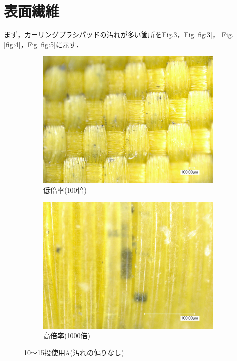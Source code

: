 \documentclass[main]{subfiles}
\begin{document}
\section{表面繊維}

まず，カーリングブラシパッドの汚れが多い箇所をFig.\ref{fig:2}，Fig.\ref{fig:3}，
Fig.\ref{fig:4}，Fig.\ref{fig:5}に示す．


\begin{figure}[H]
    \centering
    \begin{subfigure}[htbp]{0.45\linewidth}
        \centering
        \includegraphics[keepaspectratio, width=0.8\linewidth]{figures/縁/カーリングパッド10-15低倍率.jpg}
        \caption{低倍率(100倍)}
        \label{fig:label}
    \end{subfigure}
    \begin{subfigure}[htbp]{0.45\linewidth}
        \centering
        \includegraphics[keepaspectratio, width=0.8\linewidth]{figures/縁/カーリングパッド10-15.jpg}
        \caption{高倍率(1000倍)}
        \label{fig:label}
    \end{subfigure}
    \caption{10～15投使用A(汚れの偏りなし)}
    \label{fig:2}
\end{figure}
    
\end{document}
